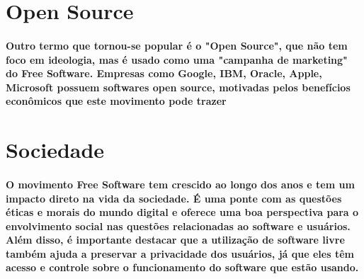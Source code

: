 \documentclass{article}
\begin{document}
\section{Open Source}
\paragraph{Outro termo que tornou-se popular é o "Open Source", que não tem foco em ideologia, mas é usado como uma "campanha de marketing" do Free Software. Empresas como Google, IBM, Oracle, Apple, Microsoft possuem softwares open source, motivadas pelos benefícios econômicos que este movimento pode trazer}

\section{Sociedade}
\paragraph{O movimento Free Software tem crescido ao longo dos anos e tem um impacto direto na vida da sociedade. É uma ponte com as questões éticas e morais do mundo digital e oferece uma boa perspectiva para o envolvimento social nas questões relacionadas ao software e usuários. Além disso, é importante destacar que a utilização de software livre também ajuda a preservar a privacidade dos usuários, já que eles têm acesso e controle sobre o funcionamento do software que estão usando.}
\end{document}
